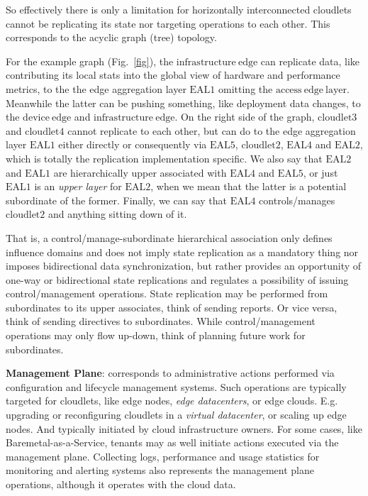 \documentclass[conference]{IEEEtran}
\begin{document}
So effectively there is only a limitation for horizontally interconnected
cloudlets cannot be replicating its state nor targeting operations to each other.
This corresponds to the acyclic graph (tree) topology.

For the example graph (Fig.~\ref{fig}), the $\mathrm{infrastructure\ edge}$ can
replicate data, like contributing its local stats into the global view of
hardware and performance metrics, to the the edge aggregation layer
$\mathrm{EAL1}$ omitting the $\mathrm{access\ edge\ layer}$. Meanwhile the
latter can be pushing something, like deployment data changes, to the
$\mathrm{device\ edge}$ and $\mathrm{infrastructure\ edge}$. On the right side
of the graph, $\mathrm{cloudlet3}$ and $\mathrm{cloudlet4}$ cannot replicate to
each other, but can do to the edge aggregation layer $\mathrm{EAL1}$ either
directly or consequently via $\mathrm{EAL5}$, $\mathrm{cloudlet2}$,
$\mathrm{EAL4}$ and $\mathrm{EAL2}$, which is totally the replication
implementation specific. We also say that $\mathrm{EAL2}$ and $\mathrm{EAL1}$
are hierarchically upper associated with $\mathrm{EAL4}$ and $\mathrm{EAL5}$,
or just $\mathrm{EAL1}$ is an \textit{upper layer} for $\mathrm{EAL2}$, when we
mean that the latter is a potential subordinate of the former. Finally, we can
say that $\mathrm{EAL4}$ controls/manages $\mathrm{cloudlet2}$ and anything
sitting down of it.

That is, a control/manage-subordinate hierarchical association only defines
influence domains and does not imply state replication as a mandatory thing nor
imposes bidirectional data synchronization, but rather provides an opportunity
of one-way or bidirectional state replications and regulates a possibility of
issuing control/management operations. State replication may be performed from
subordinates to its upper associates, think of sending reports. Or vice versa,
think of sending directives to subordinates. While control/management
operations may only flow up-down, think of planning future work for
subordinates.

\textbf{Management Plane}: corresponds to administrative actions performed via
configuration and lifecycle management systems. Such operations are typically
targeted for cloudlets, like edge nodes, \textit{edge datacenters}\cite{b3},
or edge clouds. E.g. upgrading or reconfiguring cloudlets in a \textit{virtual
datacenter}\cite{b3}, or scaling up edge nodes. And typically initiated by
cloud infrastructure owners. For some cases, like Baremetal-as-a-Service,
tenants may as well initiate actions executed via the management plane.
Collecting logs, performance and usage statistics for monitoring and alerting
systems also represents the management plane operations, although it operates
with the cloud data.
\end{document}
